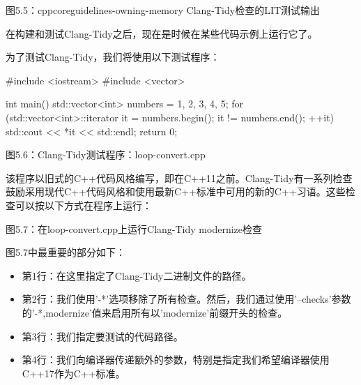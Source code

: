 \begin{center}
图5.5：cppcoreguidelines-owning-memory Clang-Tidy检查的LIT测试输出
\end{center}

在构建和测试Clang-Tidy之后，现在是时候在某些代码示例上运行它了。



为了测试Clang-Tidy，我们将使用以下测试程序：

\begin{cpp}
#include <iostream>
#include <vector>

int main() {
  std::vector<int> numbers = {1, 2, 3, 4, 5};
  for (std::vector<int>::iterator it = numbers.begin(); it != numbers.end();
    ++it) {
    std::cout << *it << std::endl;
  }
  return 0;
}
\end{cpp}

\begin{center}
图5.6：Clang-Tidy测试程序：loop-convert.cpp
\end{center}

该程序以旧式的C++代码风格编写，即在C++11之前。Clang-Tidy有一系列检查鼓励采用现代C++代码风格和使用最新C++标准中可用的新的C++习语。这些检查可以按以下方式在程序上运行：


\begin{center}
图5.7：在loop-convert.cpp上运行Clang-Tidy modernize检查
\end{center}

图5.7中最重要的部分如下：

\begin{itemize}
\item
第1行：在这里指定了Clang-Tidy二进制文件的路径。

\item
第2行：我们使用'-*'选项移除了所有检查。然后，我们通过使用'–checks'参数的'-*,modernize'值来启用所有以'modernize'前缀开头的检查。

\item
第3行：我们指定要测试的代码路径。

\item
第4行：我们向编译器传递额外的参数，特别是指定我们希望编译器使用C++17作为C++标准。
\end{itemize}


